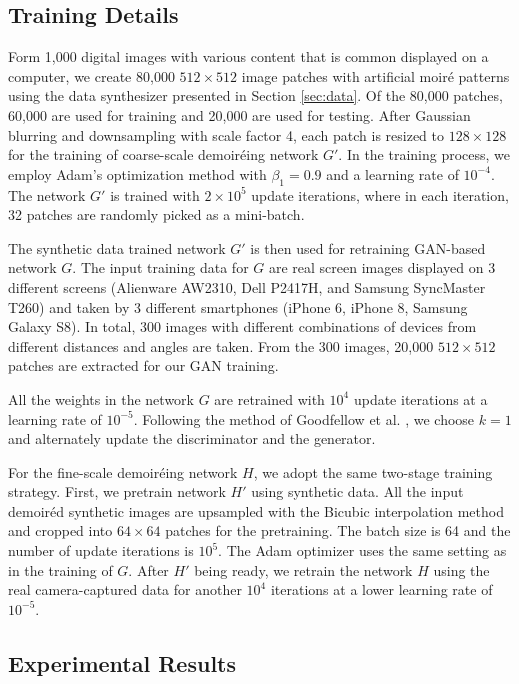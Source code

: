 \documentclass[10pt,twocolumn,letterpaper]{article}
\begin{document}
\subsection{Training Details}
\label{sec:training}

Form 1,000 digital images with various content that is common
displayed on a computer, we create 80,000 $512\times 512$ image
patches with artificial moir\'e patterns using the data synthesizer
presented in Section \ref{sec:data}.  Of the 80,000 patches, 60,000
are used for training and 20,000 are used for testing.  After Gaussian
blurring and downsampling with scale factor 4, each patch is resized
to $128\times 128$ for the training of coarse-scale demoir\'eing
network $G'$.  In the training process, we employ Adam's optimization
method \cite{kinga2015method} with $\beta_1 = 0.9$ and a learning rate
of $10^{-4}$.  The network $G'$ is trained with $2 \times 10^5$ update
iterations, where in each iteration, 32 patches are randomly picked as
a mini-batch.


The synthetic data trained network $G'$ is then used for retraining
GAN-based network $G$.  The input training data for $G$ are real
screen images displayed on 3 different screens (Alienware AW2310, Dell
P2417H, and Samsung SyncMaster T260) and taken by 3 different
smartphones (iPhone 6, iPhone 8, Samsung Galaxy S8).  In total, 300
images with different combinations of devices from different distances
and angles are taken.  From the 300 images, 20,000 $512\times 512$
patches are extracted for our GAN training. 

All the weights in the network $G$ are retrained with $10^4$ update
iterations at a learning rate of $10^{-5}$.  Following the method of
Goodfellow et al. \cite{goodfellow2014generative}, we choose $k = 1$
and alternately update the discriminator and the generator.

For the fine-scale demoir\'eing network $H$, we adopt the same
two-stage training strategy.  First, we pretrain network $H'$ using
synthetic data.  All the input demoir\'ed synthetic images are
upsampled with the Bicubic interpolation method and cropped into
$64\times 64$ patches for the pretraining.  The batch size is 64 and
the number of update iterations is $10^5$.  The Adam optimizer uses
the same setting as in the training of $G$.  After $H'$ being ready,
we retrain the network $H$ using the real camera-captured data for
another $10^4$ iterations at a lower learning rate of $10^{-5}$.

\subsection{Experimental Results}
\label{sec:exp_results}
\end{document}
